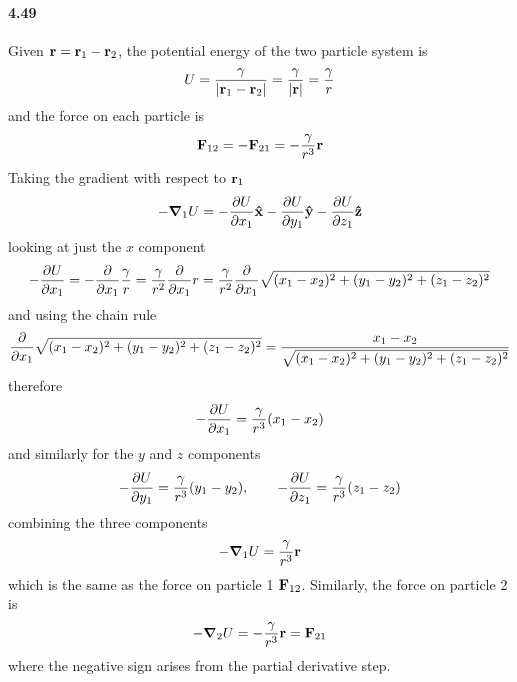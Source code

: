 \documentclass[../problems.tex]{subfiles}
\begin{document}
\paragraph{4.49}
Given $\vb{r} = \vb{r}_1 - \vb{r}_2$, the potential energy of the two particle system is
\begin{align*}
    U = \frac{\gamma}{\abs{\vb{r}_1 - \vb{r}_2}} = \frac{\gamma}{\abs{\vb{r}}} = \frac{\gamma}{r}
\end{align*}
and the force on each particle is
\begin{align*}
    \vb{F}_{12} = -\vb{F}_{21} = -\frac{\gamma}{r^3} \vb{r}
\end{align*}
Taking the gradient with respect to $\vb{r}_1$
\begin{align*}
    -\grad_1 U = -\pdv{U}{x_1} \vu{x} - \pdv{U}{y_1} \vu{y} - \pdv{U}{z_1} \vu{z}
\end{align*}
looking at just the $x$ component
\begin{align*}
    -\pdv{U}{x_1} = -\pdv{x_1} \frac{\gamma}{r} = \frac{\gamma}{r^2} \pdv{x_1} r
    = \frac{\gamma}{r^2} \pdv{x_1} \sqrt{(x_1 - x_2)^2 + (y_1 - y_2)^2 + (z_1 - z_2)^2}
\end{align*}
and using the chain rule
\begin{align*}
    \pdv{x_1} \sqrt{(x_1 - x_2)^2 + (y_1 - y_2)^2 + (z_1 - z_2)^2}
    = \frac{x_1 - x_2}{\sqrt{(x_1 - x_2)^2 + (y_1 - y_2)^2 + (z_1 - z_2)^2}}
\end{align*}
therefore
\begin{align*}
    -\pdv{U}{x_1} = \frac{\gamma}{r^3} (x_1 - x_2)
\end{align*}
and similarly for the $y$ and $z$ components
\begin{align*}
    -\pdv{U}{y_1} = \frac{\gamma}{r^3} (y_1 - y_2), \qquad
    -\pdv{U}{z_1} = \frac{\gamma}{r^3} (z_1 - z_2)
\end{align*}
combining the three components
\begin{align*}
    -\grad_1 U = \frac{\gamma}{r^3} \vb{r}
\end{align*}
which is the same as the force on particle 1 $\vb{F}_{12}$. Similarly, the force on particle 2 is
\begin{align*}
    -\grad_2 U = -\frac{\gamma}{r^3} \vb{r} = \vb{F}_{21}
\end{align*}
where the negative sign arises from the partial derivative step.
\end{document}

